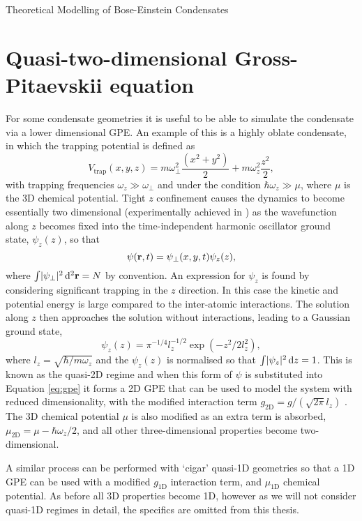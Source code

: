 \begin{chapter}{\label{cha:theoretical_model}Theoretical Modelling of Bose-Einstein Condensates}
\section{\label{section:quasi2dgpe} Quasi-two-dimensional Gross-Pitaevskii equation}
	For some condensate geometries it is useful to be able to simulate the condensate via a lower dimensional GPE. An example of this is a highly oblate condensate, in which the trapping potential is defined as
	\begin{equation}
		V_{\mathrm{trap}}(x,y,z)=m\omega_\perp^2\frac{\left ( x^2+y^2 \right )}{2} + m\omega_z^2\frac{z^2}{2},
	\end{equation}
	with trapping frequencies $\omega_z \gg \omega_\perp$ and under the condition $\hbar\omega_z \gg \mu$, where $\mu$ is the 3D chemical potential. Tight $z$ confinement causes the dynamics to become essentially two dimensional (experimentally achieved in \cite{Gorlitz}) as the wavefunction along $z$ becomes fixed into the time-independent harmonic oscillator ground state, $\psi_z(z)$, so that
	\begin{equation}
		\psi({\bf r},t) = \psi_\perp(x,y,t) \psi_z(z),
	\end{equation}
	where $\int\!|\psi_\perp|^2\,{\rm d}^2{\bf r} = N$ by convention. An expression for $\psi_z$ is found by considering significant trapping in the $z$ direction. In this case the kinetic and potential energy is large compared to the inter-atomic interactions. The solution along $z$ then approaches the solution without interactions, leading to a Gaussian ground state,
	\begin{equation}
		\psi_z(z) = \pi^{-1/4} l_z^{-1/2} \exp\left(-z^2/2l_z^2\right),
	\end{equation}
  where $l_z=\sqrt{\hbar/m \omega_z}$ and the $\psi_z(z)$ is normalised so that $\int\!|\psi_z|^2\,{\rm d}z = 1$. This is known as the quasi-2D regime and when this form of $\psi$ is substituted into Equation \ref{eq:gpe} it forms a 2D GPE that can be used to model the system with reduced dimensionality, with the modified interaction term $g_{\mathrm{2D}} = g/( \sqrt{2\pi}l_z)$ \cite{parkerthesis}. The 3D chemical potential $\mu$ is also modified as an extra term is absorbed, $\mu_\mathrm{2D} = \mu - \hbar\omega_z/2$, and all other three-dimensional properties become two-dimensional.

	A similar process can be performed with `cigar' quasi-1D geometries so that a 1D GPE can be used with a modified $g_{\mathrm{1D}}$ interaction term, and $\mu_{\mathrm{1D}}$ chemical potential. As before all 3D properties become 1D, however as we will not consider quasi-1D regimes in detail, the specifics are omitted from this thesis.


\end{chapter}
